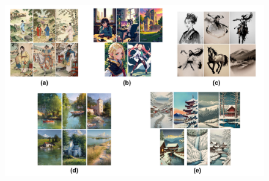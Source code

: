 \begin{figure}[!h]
    \centering
    \includegraphics[width=0.85\linewidth]{figures/supp/multi_reference.pdf}
    \vspace{-1.2em}
    \label{fig:supp_multi_ref}
    \vspace{0.3em}



\end{figure}
